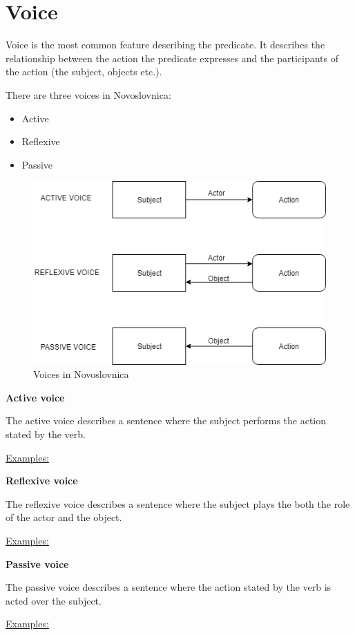 \section{Voice}

Voice is the most common feature describing the predicate. It describes the relationship between the action the predicate expresses and the participants of the action (the subject, objects etc.).

There are three voices in Novoslovnica:

\begin{itemize}
	\item Active
	\item Reflexive
	\item Passive
\end{itemize}

\begin{figure}
	\includegraphics[width=\linewidth]{./sources/voices.png}
	\caption{Voices in Novoslovnica}
	\label{fig:voices}
\end{figure}

\textbf{Active voice}

The active voice describes a sentence where the subject performs the action stated by the verb.

\underline{Examples:}

\textbf{Reflexive voice}

The reflexive voice describes a sentence where the subject plays the both the role of the actor and the object.

\underline{Examples:}

\textbf{Passive voice}

The passive voice describes a sentence where the action stated by the verb is acted over the subject.

\underline{Examples:}